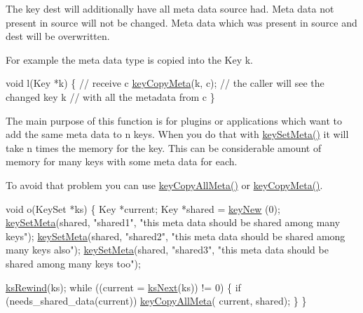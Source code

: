 The key dest will additionally have all meta data source had. Meta data not present in source will not be changed. Meta data which was present in source and dest will be overwritten.

For example the meta data type is copied into the Key k.


\begin{DoxyCode}
\textcolor{keywordtype}{void} l(Key *k)
\{
        \textcolor{comment}{// receive c}
        \hyperlink{group__keymeta_ga9a22b992478e613c8788bd460b4a1f0c}{keyCopyMeta}(k, c);
        \textcolor{comment}{// the caller will see the changed key k}
        \textcolor{comment}{// with all the metadata from c}
\}
\end{DoxyCode}


The main purpose of this function is for plugins or applications which want to add the same meta data to n keys. When you do that with \hyperlink{group__keymeta_gae1f15546b234ffb6007d8a31178652b9}{key\-Set\-Meta()} it will take n times the memory for the key. This can be considerable amount of memory for many keys with some meta data for each.

To avoid that problem you can use \hyperlink{group__keymeta_ga8e63720a65610a29597494d0671f9401}{key\-Copy\-All\-Meta()} or \hyperlink{group__keymeta_ga9a22b992478e613c8788bd460b4a1f0c}{key\-Copy\-Meta()}.


\begin{DoxyCode}
\textcolor{keywordtype}{void} o(KeySet *ks)
\{
        Key *current;
        Key *shared = \hyperlink{group__key_gaf6893c038b3ebee90c73a9ea8356bebf}{keyNew} (0);
        \hyperlink{group__keymeta_gae1f15546b234ffb6007d8a31178652b9}{keySetMeta}(shared, \textcolor{stringliteral}{"shared1"}, \textcolor{stringliteral}{"this meta data should be
       shared among many keys"});
        \hyperlink{group__keymeta_gae1f15546b234ffb6007d8a31178652b9}{keySetMeta}(shared, \textcolor{stringliteral}{"shared2"}, \textcolor{stringliteral}{"this meta data should be
       shared among many keys also"});
        \hyperlink{group__keymeta_gae1f15546b234ffb6007d8a31178652b9}{keySetMeta}(shared, \textcolor{stringliteral}{"shared3"}, \textcolor{stringliteral}{"this meta data should be
       shared among many keys too"});

        \hyperlink{group__keyset_gabe793ff51f1728e3429c84a8a9086b70}{ksRewind}(ks);
        \textcolor{keywordflow}{while} ((current = \hyperlink{group__keyset_ga317321c9065b5a4b3e33fe1c399bcec9}{ksNext}(ks)) != 0)
        \{
                \textcolor{keywordflow}{if} (needs\_shared\_data(current)) \hyperlink{group__keymeta_ga8e63720a65610a29597494d0671f9401}{keyCopyAllMeta}(
      current, shared);
        \}
\}
\end{DoxyCode}


